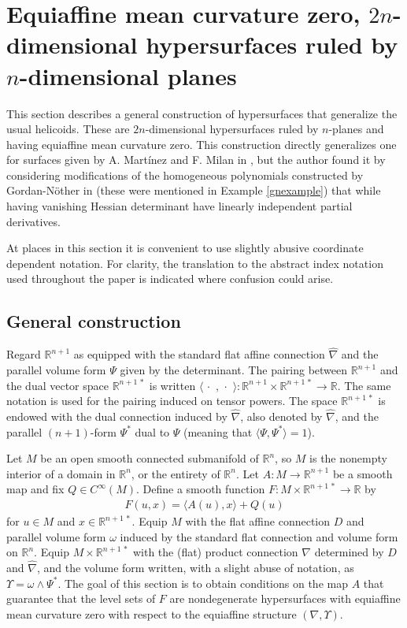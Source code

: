 \documentclass [leqno, 10pt]{amsart}
\theoremstyle{definition}
\numberwithin{equation}{section}
\newcommand{\om}{\omega}
\newcommand{\dum}{\,\cdot\,\,}
\newcommand{\cinf}{C^{\infty}}
\newcommand{\lb}{\langle}
\newcommand{\ra}{\rangle}
\newcommand{\hnabla}{\widehat{\nabla}}
\newcommand{\rea}{\mathbb R}
\begin{document}
\section{Equiaffine mean curvature zero, \texorpdfstring{$2n$}{}-dimensional hypersurfaces ruled by \texorpdfstring{$n$}{}-dimensional planes}\label{examplesection}
This section describes a general construction of hypersurfaces that generalize the usual helicoids. These are $2n$-dimensional hypersurfaces ruled by $n$-planes and having equiaffine mean curvature zero. This construction directly generalizes one for surfaces given by A. Mart\'inez and F. Milan in \cite{Martinez-Milan}, but the author found it by considering modifications of the homogeneous polynomials constructed by Gordan-N\"other in \cite{Gordan-Noether} (these were mentioned in Example \ref{gnexample}) that while having vanishing Hessian determinant have linearly independent partial derivatives. 

At places in this section it is convenient to use slightly abusive coordinate dependent notation. For clarity, the translation to the abstract index notation used throughout the paper is indicated where confusion could arise. 

\subsection{General construction}\label{ruledexamplesection}
Regard $\rea^{n+1}$ as equipped with the standard flat affine connection $\hnabla$ and the parallel volume form $\Psi$ given by the determinant. The pairing between $\rea^{n+1}$ and the dual vector space $\rea^{n+1\,\ast}$ is written $\lb \dum, \dum \ra:\rea^{n+1} \times\rea^{n+1\,\ast} \to \rea$. The same notation is used for the pairing induced on tensor powers. The space $\rea^{n+1\,\ast}$ is endowed with the dual connection induced by $\hnabla$, also denoted by $\hnabla$, and the parallel $(n+1)$-form $\Psi^{\ast}$ dual to $\Psi$ (meaning that $\lb \Psi, \Psi^{\ast} \ra = 1$). 

Let $M$ be an open smooth connected submanifold of $\rea^{n}$, so $M$ is the nonempty interior of a domain in $\rea^{n}$, or the entirety of $\rea^{n}$. Let $A:M \to \rea^{n+1}$ be a smooth map and fix $Q \in \cinf(M)$. Define a smooth function $F:M \times \rea^{n+1\,\ast} \to \rea$ by 
\begin{align}
F(u, x) =\lb A(u), x\ra + Q(u) 
\end{align}
for $u \in M$ and $x \in \rea^{n+1\,\ast}$. 
Equip $M$ with the flat affine connection $D$ and parallel volume form $\om$ induced by the standard flat connection and volume form on $\rea^{n}$. Equip $M \times \rea^{n+1\,\ast}$ with the (flat) product connection $\nabla$ determined by $D$ and $\hnabla$, and the volume form written, with a slight abuse of notation, as $\Upsilon  = \om \wedge \Psi^{\ast}$. The goal of this section is to obtain conditions on the map $A$ that guarantee that the level sets of $F$ are nondegenerate hypersurfaces with equiaffine mean curvature zero with respect to the equiaffine structure $(\nabla, \Upsilon)$. 
\end{document}
